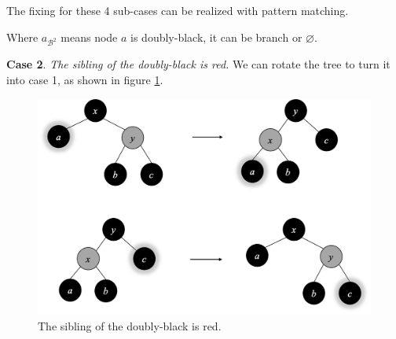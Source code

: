 \documentclass[b5paper]{article}
\begin{document}
The fixing for these 4 sub-cases can be realized with pattern matching.

\be
{}
\label{eq:db-case-1}
\ee

Where $a_{\mathcal{B}^2}$ means node $a$ is doubly-black, it can be branch or $\pmb{\varnothing}$.

\textbf{Case 2}. {\em The sibling of the doubly-black is red.} We can rotate the tree to turn it into case 1, as shown in figure \ref{fig:del-case2}.

\begin{figure}[htbp]
  \centering
  \includegraphics[scale=0.4]{img/del-case2.png}
  \caption{The sibling of the doubly-black is red.}
  \label{fig:del-case2}
\end{figure}
\end{document}
